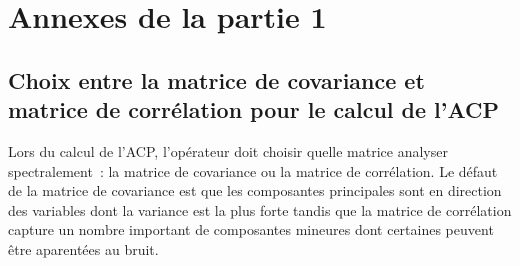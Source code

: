 \chapter{Annexes de la partie 1}\label{annexe-1}
\dochaptoc

\section{Choix entre la matrice de covariance et matrice de corrélation pour le calcul de l'ACP}\label{abstr-pca-corr-cov}

        Lors du calcul de l'ACP, l'opérateur doit choisir quelle matrice analyser spectralement : la matrice de covariance ou la matrice de corrélation. Le défaut de la matrice de covariance est que les composantes principales sont  en direction des variables dont la variance est la plus forte tandis que la matrice de corrélation capture un nombre important de composantes mineures dont certaines peuvent être aparentées au bruit.

